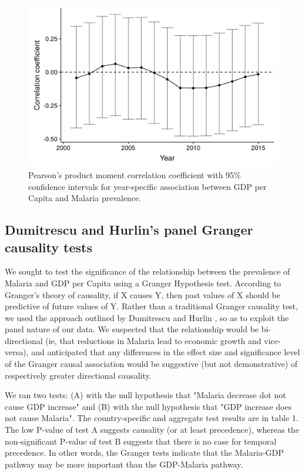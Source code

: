 \documentclass[9pt,twocolumn,twoside,lineno]{pnas-new}
\begin{document}
\begin{figure}%
\centering
\includegraphics[width=.95\linewidth]{../figures/cor}
\caption{Pearson's product moment correlation coefficient with 95\% confidence intervals for year-specific association between GDP per Capita and Malaria prevalence.}
\label{fig:cor}
\end{figure}


\subsection*{Dumitrescu and Hurlin's panel Granger causality tests}

We sought to test the significance of the relationship between the prevalence of Malaria and GDP per Capita using a Granger Hypothesis test. According to Granger's theory of causality, if X causes Y, then past values of X should be predictive of future values of Y. Rather than a traditional Granger causality test, we used the approach outlined by Dumitrescu and Hurlin \cite{dumitrescu}, so as to exploit the panel nature of our data. We suspected that the relationship would be bi-directional (ie, that reductions in Malaria lead to economic growth and vice-versa), and anticipated that any differences in the effect size and significance level of the Granger causal association would be suggestive (but not demonstrative) of respectively greater directional causality.

We ran two tests: (A) with the null hypothesis that "Malaria decrease dot not cause GDP increase" and (B) with the null hypothesis that "GDP increase does not cause Malaria". The country-specific and aggregate test results are in table 1. The low P-value of test A suggests causality (or at least precedence), whereas the non-significant P-value of test B suggests that there is no case for temporal precedence. In other words, the Granger tests indicate that the Malaria-GDP pathway may be more important than the GDP-Malaria pathway.
\end{document}
